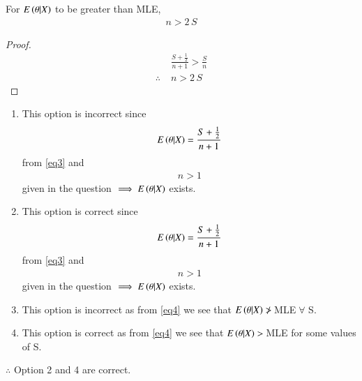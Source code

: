 \documentclass[journal,12pt,twocolumn]{IEEEtran}
\begin{document}
\begin{corollary}
For $E\left(\theta|X\right)$ to be greater than MLE,
\begin{align}
    n>2\,S\label{eq4}
\end{align}
\end{corollary}

\begin{proof}
\begin{align}
    &\frac{S+\frac{1}{2}}{n+1} > \frac{S}{n}\nonumber\\
     \therefore\;&n>2\,S
\end{align}
\end{proof}

\begin{enumerate}
    \item This option is incorrect since 
    \begin{align*}
        E\left(\theta|X\right) = \frac{S+\frac{1}{2}}{n+1} 
    \end{align*}
       from \eqref{eq3} and
    \begin{align*}
        n>1 
    \end{align*}
    given in the question $\implies E\left(\theta|X\right)$ exists.
    \item This option is correct since 
    \begin{align*}
        E\left(\theta|X\right) = \frac{S+\frac{1}{2}}{n+1} 
    \end{align*}
       from \eqref{eq3} and
    \begin{align*}
        n>1 
    \end{align*}
    given in the question $\implies E\left(\theta|X\right)$ exists.
    \item This option is incorrect as from \eqref{eq4} we see that $E\left(\theta|X\right)\ngtr\, $MLE$\;\forall$ S.
    \item This option is correct as from \eqref{eq4} we see that $E\left(\theta|X\right)>\, $MLE for some values of S.
\end{enumerate}
$\therefore$ Option 2 and 4 are correct.
\end{document}
